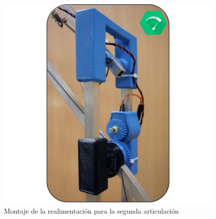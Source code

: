     \begin{minipage}{0.47\textwidth}
        \begin{figure}[H]
            \centering
            \includegraphics[width=1.15\textwidth]{figuras/Imagenes_Electronica/foto_brazo_3.jpg}
            \caption{Montaje de la realimentación para la segunda articulación}
            \label{fig:Mecanica:realimentacion_1}
        \end{figure}
    \end{minipage}
